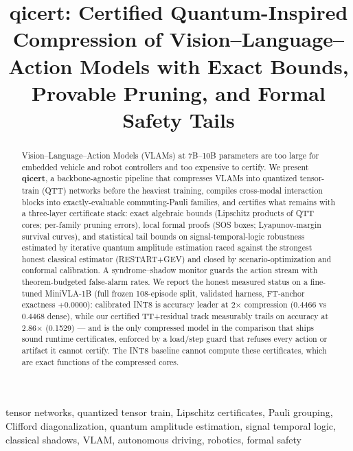\documentclass[conference,10pt]{IEEEtran}
\begin{document}
\title{qicert: Certified Quantum-Inspired Compression of Vision--Language--Action
Models with Exact Bounds, Provable Pruning, and Formal Safety Tails}

\author{
}

\maketitle

\begin{abstract}
Vision--Language--Action Models (VLAMs) at 7B--10B parameters are too large for
embedded vehicle and robot controllers and too expensive to certify. We present
\textbf{qicert}, a backbone-agnostic pipeline that compresses VLAMs into
quantized tensor-train (QTT) networks before the heaviest training, compiles
cross-modal interaction blocks into exactly-evaluable commuting-Pauli families,
and certifies what remains with a three-layer certificate stack: exact
algebraic bounds (Lipschitz products of QTT cores; per-family pruning errors),
local formal proofs (SOS boxes; Lyapunov-margin survival curves), and
statistical tail bounds on signal-temporal-logic robustness estimated by
iterative quantum amplitude estimation raced against the strongest honest
classical estimator (RESTART+GEV) and closed by scenario-optimization and
conformal calibration. A syndrome--shadow monitor guards the action stream with
theorem-budgeted false-alarm rates. We report the honest measured status on a
fine-tuned MiniVLA-1B (full frozen 108-episode split, validated harness,
FT-anchor exactness $+0.0000$): calibrated INT8 is accuracy leader at
2$\times$ compression (0.4466 vs 0.4468 dense), while our certified
TT+residual track measurably trails on accuracy at 2.86$\times$ (0.1529) ---
and is the only compressed model in the comparison that ships sound runtime
certificates, enforced by a load/step guard that refuses every action or
artifact it cannot certify. The INT8 baseline cannot compute these
certificates, which are exact functions of the compressed cores.
\end{abstract}

\begin{IEEEkeywords}
tensor networks, quantized tensor train, Lipschitz certificates, Pauli grouping,
Clifford diagonalization, quantum amplitude estimation, signal temporal logic,
classical shadows, VLAM, autonomous driving, robotics, formal safety
\end{IEEEkeywords}
\end{document}
